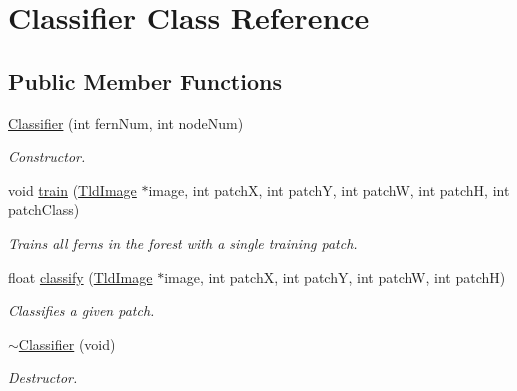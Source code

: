 \hypertarget{class_classifier}{\section{\-Classifier \-Class \-Reference}
\label{class_classifier}
}
\subsection*{\-Public \-Member \-Functions}
\begin{DoxyCompactItemize}
\item 
\hyperlink{class_classifier_ac54d51dcb12fb03418626fa6457485dc}{\-Classifier} (int fern\-Num, int node\-Num)
\begin{DoxyCompactList}\small\item\em \-Constructor. \end{DoxyCompactList}\item 
void \hyperlink{class_classifier_a29063c138f375446683494ba704336f4}{train} (\hyperlink{class_tld_image}{\-Tld\-Image} $\ast$image, int patch\-X, int patch\-Y, int patch\-W, int patch\-H, int patch\-Class)
\begin{DoxyCompactList}\small\item\em \-Trains all ferns in the forest with a single training patch. \end{DoxyCompactList}\item 
float \hyperlink{class_classifier_a24977919fcadbac825526538c59eb481}{classify} (\hyperlink{class_tld_image}{\-Tld\-Image} $\ast$image, int patch\-X, int patch\-Y, int patch\-W, int patch\-H)
\begin{DoxyCompactList}\small\item\em \-Classifies a given patch. \end{DoxyCompactList}\item 
\hypertarget{class_classifier_a9f5173e79559e37b9f08492da5d14d0b}{\hyperlink{class_classifier_a9f5173e79559e37b9f08492da5d14d0b}{$\sim$\-Classifier} (void)}\label{class_classifier_a9f5173e79559e37b9f08492da5d14d0b}

\begin{DoxyCompactList}\small\item\em \-Destructor. \end{DoxyCompactList}\end{DoxyCompactItemize}


